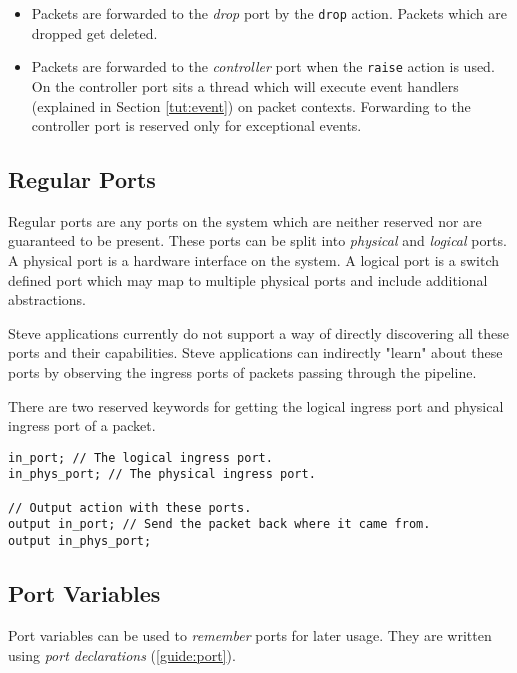 \begin{itemize}
\item Packets are forwarded to the \textit{drop} port by the \texttt{drop} action.
Packets which are dropped get deleted.

\item Packets are forwarded to the \textit{controller} port when the \texttt{raise}
action is used. On the controller port sits a thread which will
execute event handlers (explained in Section \ref{tut:event}) on packet
contexts. Forwarding to the controller port is reserved only for exceptional
events.
\end{itemize}

\subsection{Regular Ports} \label{tut:regular_ports}

Regular ports are any ports on the system which are neither reserved nor are
guaranteed to be present. These ports can be split into \textit{physical} and
\textit{logical} ports. A physical port is a hardware interface on the system. A
logical port is a switch defined port which may map to multiple physical ports
and include additional abstractions.

Steve applications currently do not support a way of directly discovering all
these ports and their capabilities. Steve applications can indirectly "learn"
about these ports by observing the ingress ports of packets passing
through the pipeline.

There are two reserved keywords for getting the logical ingress port and physical ingress port of a packet.

\begin{codepage}
\begin{lstlisting}
in_port; // The logical ingress port.
in_phys_port; // The physical ingress port.

// Output action with these ports.
output in_port; // Send the packet back where it came from.
output in_phys_port;
\end{lstlisting}
\end{codepage}

\subsection{Port Variables} \label{tut:declared_ports}

Port variables can be used to \textit{remember} ports for later usage. They are
written using \textit{port declarations} (\ref{guide:port}).

